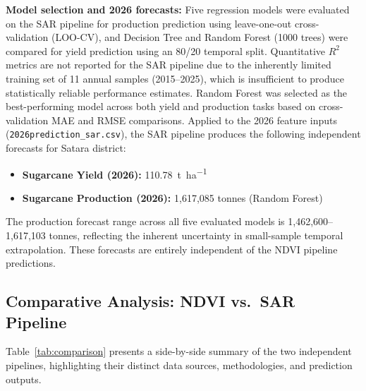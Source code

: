 \documentclass[conference]{IEEEtran}
\begin{document}
\textbf{Model selection and 2026 forecasts:} Five regression models were
evaluated on the SAR pipeline for production prediction using
leave-one-out cross-validation (LOO-CV), and Decision Tree and Random Forest
(1000 trees) were compared for yield prediction using an 80/20 temporal
split. Quantitative $R^2$ metrics are not reported for the SAR pipeline due
to the inherently limited training set of 11 annual samples (2015--2025),
which is insufficient to produce statistically reliable performance estimates.
Random Forest was selected as the best-performing model across both yield and
production tasks based on cross-validation MAE and RMSE comparisons.
Applied to the 2026 feature inputs (\texttt{2026prediction\_sar.csv}),
the SAR pipeline produces the following independent forecasts for Satara
district:

\begin{itemize}[leftmargin=*]
  \item \textbf{Sugarcane Yield (2026):} \SI{110.78}{\tonne\per\hectare}
  \item \textbf{Sugarcane Production (2026):} 1{,}617{,}085 tonnes (Random Forest)
\end{itemize}

The production forecast range across all five evaluated models is
1{,}462{,}600--1{,}617{,}103 tonnes, reflecting the inherent uncertainty in
small-sample temporal extrapolation. These forecasts are entirely independent
of the NDVI pipeline predictions.

\subsection{Comparative Analysis: NDVI vs.\ SAR Pipeline}

Table~\ref{tab:comparison} presents a side-by-side summary of the two
independent pipelines, highlighting their distinct data sources, methodologies,
and prediction outputs.
\end{document}
